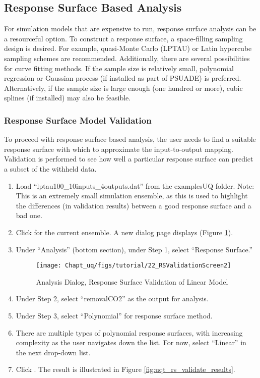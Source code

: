 \subsection{Response Surface Based Analysis}
\label{tutorial.uq.rs}

For simulation models that are expensive to run, response surface analysis can be a resourceful option. To construct a response surface, a space-filling sampling design is desired. For example, quasi-Monte Carlo (LPTAU) or Latin hypercube sampling schemes are recommended. Additionally, there are several possibilities for curve fitting methods. If the sample size is relatively small, polynomial regression or Gaussian process (if installed as part of PSUADE) is preferred. Alternatively, if the sample size is large enough (one hundred or more), cubic splines (if installed) may also be feasible.

\subsubsection{Response Surface Model Validation}

To proceed with response surface based analysis, the user needs to find a suitable response surface with which to approximate the input-to-output mapping. Validation is performed to see how well a particular response surface can predict a subset of the withheld data.
\begin{enumerate}
\item{Load ``lptau100\_10inputs\_4outputs.dat'' from the examples\bs UQ folder. Note: This is an extremely small simulation ensemble, as this is used to highlight the differences (in validation results) between a good response surface and a bad one.}
\item{Click  for the current ensemble. A new dialog page displays (Figure \ref{fig:uqt_rs_validate}).}
\item{Under ``Analysis'' (bottom section), under Step 1, select ``Response Surface.''
\begin{figure}[H]
\centering \texttt{[image: Chapt\_uq/figs/tutorial/22\_RSValidationScreen2]}
\caption{Analysis Dialog, Response Surface Validation of Linear Model}
\label{fig:uqt_rs_validate}
\end{figure}
}
\item{Under Step 2, select ``removalCO2'' as the output for analysis.}
\item{Under Step 3, select ``Polynomial'' for response surface method.}
\item{There are multiple types of polynomial response surfaces, with increasing complexity as
the user navigates down the list. For now, select ``Linear'' in the next drop-down list.}
\item{Click .  The result is illustrated in Figure \ref{fig:uqt_rs_validate_results}.}
\end{enumerate}

